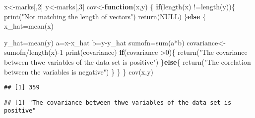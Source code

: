\documentclass[
]{article}
\newenvironment{Shaded}{\begin{snugshade}}{\end{snugshade}}
\newcommand{\ConstantTok}[1]{\textcolor[rgb]{0.00,0.00,0.00}{#1}}
\newcommand{\ControlFlowTok}[1]{\textcolor[rgb]{0.13,0.29,0.53}{\textbf{#1}}}
\newcommand{\DecValTok}[1]{\textcolor[rgb]{0.00,0.00,0.81}{#1}}
\newcommand{\FunctionTok}[1]{\textcolor[rgb]{0.00,0.00,0.00}{#1}}
\newcommand{\NormalTok}[1]{#1}
\newcommand{\OtherTok}[1]{\textcolor[rgb]{0.56,0.35,0.01}{#1}}
\newcommand{\SpecialCharTok}[1]{\textcolor[rgb]{0.00,0.00,0.00}{#1}}
\newcommand{\StringTok}[1]{\textcolor[rgb]{0.31,0.60,0.02}{#1}}
\begin{document}
\begin{Shaded}
\begin{Highlighting}[]
\NormalTok{x}\OtherTok{\textless{}{-}}\NormalTok{marks[,}\DecValTok{2}\NormalTok{]}
\NormalTok{y}\OtherTok{\textless{}{-}}\NormalTok{marks[,}\DecValTok{3}\NormalTok{]}
\NormalTok{cov}\OtherTok{\textless{}{-}}\ControlFlowTok{function}\NormalTok{(x,y) \{}
  \ControlFlowTok{if}\NormalTok{(}\FunctionTok{length}\NormalTok{(x) }\SpecialCharTok{!=}\FunctionTok{length}\NormalTok{(y))\{}
    \FunctionTok{print}\NormalTok{(}\StringTok{"Not matching the length of vectors"}\NormalTok{)}
    \FunctionTok{return}\NormalTok{(}\ConstantTok{NULL}\NormalTok{)}
\NormalTok{  \}}\ControlFlowTok{else}\NormalTok{ \{}
\NormalTok{    x\_hat}\OtherTok{=}\FunctionTok{mean}\NormalTok{(x)}
    
\NormalTok{    y\_hat}\OtherTok{=}\FunctionTok{mean}\NormalTok{(y)}
\NormalTok{    a}\OtherTok{=}\NormalTok{x}\SpecialCharTok{{-}}\NormalTok{x\_hat}
\NormalTok{    b}\OtherTok{=}\NormalTok{y}\SpecialCharTok{{-}}\NormalTok{y\_hat}
\NormalTok{    sumofn}\OtherTok{=}\FunctionTok{sum}\NormalTok{(a}\SpecialCharTok{*}\NormalTok{b)}
\NormalTok{    covariance}\OtherTok{\textless{}{-}}\NormalTok{sumofn}\SpecialCharTok{/}\FunctionTok{length}\NormalTok{(x)}\SpecialCharTok{{-}}\DecValTok{1}
    \FunctionTok{print}\NormalTok{(covariance)}
    \ControlFlowTok{if}\NormalTok{(covariance }\SpecialCharTok{\textgreater{}}\DecValTok{0}\NormalTok{)\{}
      \FunctionTok{return}\NormalTok{(}\StringTok{"The covariance between thwe variables of the data set is positive"}\NormalTok{)}
\NormalTok{    \}}\ControlFlowTok{else}\NormalTok{\{}
      \FunctionTok{return}\NormalTok{(}\StringTok{"The corelation between the variables is negative"}\NormalTok{)}
\NormalTok{    \}}
\NormalTok{  \}}
\NormalTok{\}}
\FunctionTok{cov}\NormalTok{(x,y)}
\end{Highlighting}
\end{Shaded}

\begin{verbatim}
## [1] 359
\end{verbatim}

\begin{verbatim}
## [1] "The covariance between thwe variables of the data set is positive"
\end{verbatim}
\end{document}
